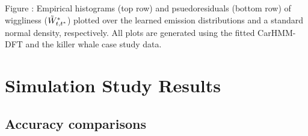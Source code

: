\documentclass{article}
\begin{document}
        \noindent Figure : Empirical histograms (top row) and psuedoresiduals (bottom row) of wiggliness ($\tilde{W}^*_{t,t^*}$) plotted over the learned emission distributions and a standard normal density, respectively. All plots are generated using the fitted CarHMM-DFT and the killer whale case study data.
        \addtocounter{fignum}{1}


\newpage
\section{Simulation Study Results}

    \subsection{Accuracy comparisons}
        
\end{document}
